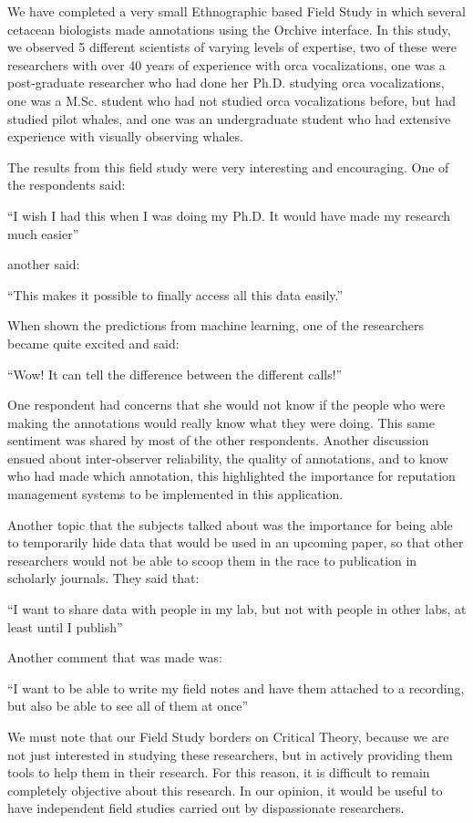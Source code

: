 \documentclass[12pt,oneside]{book}
\begin{document}
We have completed a very small Ethnographic based Field Study in which
several cetacean biologists made annotations using the Orchive
interface.  In this study, we observed 5 different scientists of
varying levels of expertise, two of these were researchers with over
40 years of experience with orca vocalizations, one was a
post-graduate researcher who had done her Ph.D. studying orca
vocalizations, one was a M.Sc. student who had not studied orca
vocalizations before, but had studied pilot whales, and one was an
undergraduate student who had extensive experience with visually
observing whales.

The results from this field study were very interesting and
encouraging.  One of the respondents said:

``I wish I had this when I was doing my Ph.D.  It would have made my
research much easier''

another said:

``This makes it possible to finally access all this data easily.''

When shown the predictions from machine learning, one of the
researchers became quite excited and said:

``Wow!  It can tell the difference between the different calls!''

One respondent had concerns that she would not know if the people who
were making the annotations would really know what they were doing.
This same sentiment was shared by most of the other respondents.
Another discussion ensued about inter-observer reliability, the quality
of annotations, and to know who had made which annotation, this
highlighted the importance for reputation management systems to be
implemented in this application.

Another topic that the subjects talked about was the importance for
being able to temporarily hide data that would be used in an upcoming
paper, so that other researchers would not be able to scoop them in
the race to publication in scholarly journals.  They said that:

``I want to share data with people in my lab, but not with people in
other labs, at least until I publish''

Another comment that was made was:

``I want to be able to write my field notes and have them attached to
a recording, but also be able to see all of them at once''

We must note that our Field Study borders on Critical Theory, because
we are not just interested in studying these researchers, but in
actively providing them tools to help them in their research.  For
this reason, it is difficult to remain completely objective about this
research.  In our opinion, it would be useful to have independent
field studies carried out by dispassionate researchers.
\end{document}
